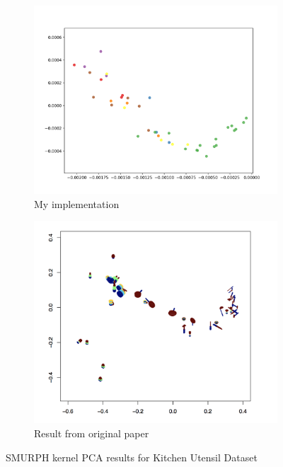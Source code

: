 \documentclass[10pt]{article}
\begin{document}
\begin{figure}[H]
    \centering
    \begin{subfigure}[h]{0.4\textwidth}
        \includegraphics[width=\linewidth]{DB_smurf}
        \caption{My implementation}
    \end{subfigure}
    \begin{subfigure}[h]{0.37\textwidth}
        \includegraphics[width=\linewidth]{original_smurph}
        \caption{Result from original paper}
    \end{subfigure}%
    \caption{SMURPH kernel PCA results for Kitchen Utensil Dataset}
    \label{fig:smurph_compare}
\end{figure}
\end{document}
